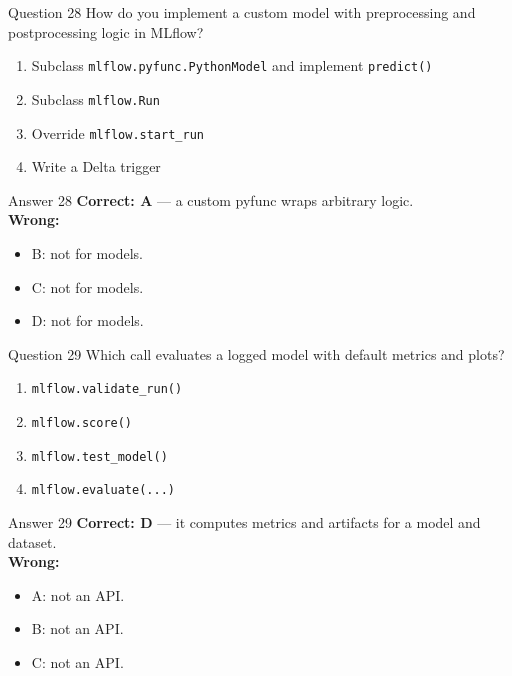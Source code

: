 \documentclass[aspectratio=169,11pt]{beamer}
\begin{document}
\begin{frame}{Question 28}
How do you implement a custom model with preprocessing and postprocessing logic in MLflow?
\begin{enumerate}[label=\Alph*.]
\item Subclass \texttt{mlflow.pyfunc.PythonModel} and implement \texttt{predict()}
\item Subclass \texttt{mlflow.Run}
\item Override \texttt{mlflow.start\_run}
\item Write a Delta trigger
\end{enumerate}
\end{frame}
\begin{frame}{Answer 28}
\textbf{Correct: A} --- a custom pyfunc wraps arbitrary logic.\\
\vspace{0.5em}
\textbf{Wrong:}
\begin{itemize}
\item B: not for models.
\item C: not for models.
\item D: not for models.
\end{itemize}
\end{frame}

\begin{frame}{Question 29}
Which call evaluates a logged model with default metrics and plots?
\begin{enumerate}[label=\Alph*.]
\item \texttt{mlflow.validate\_run()}
\item \texttt{mlflow.score()}
\item \texttt{mlflow.test\_model()}
\item \texttt{mlflow.evaluate(...)}
\end{enumerate}
\end{frame}
\begin{frame}{Answer 29}
\textbf{Correct: D} --- it computes metrics and artifacts for a model and dataset.\\
\vspace{0.5em}
\textbf{Wrong:}
\begin{itemize}
\item A: not an API.
\item B: not an API.
\item C: not an API.
\end{itemize}
\end{frame}
\end{document}
